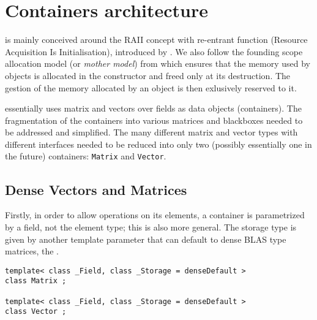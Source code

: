 \section{Containers architecture}\label{sec:container}
%
\linbox is mainly conceived around the RAII concept with re-entrant function
(Resource Acquisition Is Initialisation), introduced by
\cite{stroustrup1994design}. We also follow the {founding scope allocation}
model (or \emph{mother model}) from \cite{Dumas:2010:lbpar} which ensures that
the memory used by objects is allocated in the constructor and freed only at
its destruction. The gestion of the memory allocated by an object is then
exlusively reserved to it.
%
\par
%
\linbox essentially uses matrix and vectors over fields as data objects
(containers).  The fragmentation of the containers into various matrices and
blackboxes needed to be addressed and simplified. The many different matrix and
vector types with different interfaces needed to be reduced into only two
(possibly essentially one in the future) containers: \texttt{Matrix} and
\texttt{Vector}.
%
\subsection{Dense Vectors and Matrices}
%
Firstly, in order to allow operations on its elements, a container is
parametrized by a field, not the element type; this is also more general.  The
storage type is given by another template parameter that can default to \eg
dense BLAS type matrices, \cf the .
%
{
\begin{lstlisting}
template< class _Field, class _Storage = denseDefault >
class Matrix ;

template< class _Field, class _Storage = denseDefault >
class Vector ;
\end{lstlisting}
}
%
